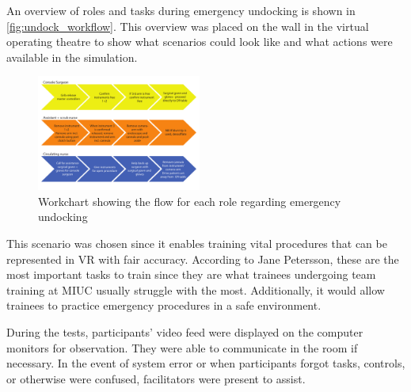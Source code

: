 \documentclass[conference]{IEEEtran}
\begin{document}
An overview of roles and tasks during emergency undocking is shown in \autoref{fig:undock_workflow}. This overview was placed on the wall in the virtual operating theatre to show what scenarios could look like and what actions were available in the simulation.

\begin{figure}[h]
	\centering
	\includegraphics[width=0.48\textwidth]{figures/workflow_chart}
	\caption{Workchart showing the flow for each role regarding emergency undocking}
	\label{fig:undock_workflow}
\end{figure}

This scenario was chosen since it enables training vital procedures that can be represented in VR with fair accuracy. According to Jane Petersson, these are the most important tasks to train since they are what trainees undergoing team training at MIUC usually struggle with the most. Additionally, it would allow trainees to practice emergency procedures in a safe environment.


During the tests, participants' video feed were displayed on the computer monitors for observation. They were able to communicate in the room if necessary. In the event of system error or when participants forgot tasks, controls, or otherwise were confused, facilitators were present to assist. 

\end{document}
